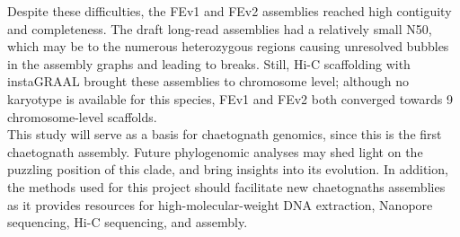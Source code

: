 Despite these difficulties, the FEv1 and FEv2 assemblies reached high contiguity and completeness. The draft long-read assemblies had a relatively small N50, which may be to the numerous heterozygous regions causing unresolved bubbles in the assembly graphs and leading to breaks. Still, Hi-C scaffolding with instaGRAAL brought these assemblies to chromosome level; although no karyotype is available for this species, FEv1 and FEv2 both converged towards 9 chromosome-level scaffolds. \\

This study will serve as a basis for chaetognath genomics, since this is the first chaetognath assembly. Future phylogenomic analyses may shed light on the puzzling position of this clade, and bring insights into its evolution. In addition, the methods used for this project should facilitate new chaetognaths assemblies as it provides resources for high-molecular-weight DNA extraction, Nanopore sequencing, Hi-C sequencing, and assembly.
